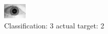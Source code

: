 \begin{figure}[h!]
\begin{center}
\includegraphics[width=0.60\columnwidth]{figures/ID1663_class_3_target_2.png}
\end{center}
\caption{ Classification: 3 actual target: 2}
\label{fig:ID1663_class_3_target_2}
\end{figure}
